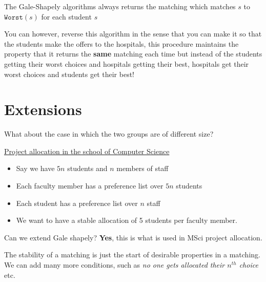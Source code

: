 \documentclass{article}
\begin{document}
  The Gale-Shapely algorithms always returns the matching which matches $s$ to $\texttt{Worst}(s) $ for each student $s$

  You can however, reverse this algorithm in the sense that you can make it so that the students make the offers to the hospitals, this procedure maintains the property that it returns the \textbf{same} matching each time but instead of the students getting their worst choices and hospitals getting their best, hospitals get their worst choices and students get their best!

  \section{Extensions}

  What about the case in which the two groups are of different size?

  \underline{Project allocation in the school of Computer Science}

  \begin{itemize}
    \item Say we have $5n$ students and $n$ members of staff
    \item Each faculty member has a preference list over $5n$ students
    \item Each student has a preference list over $n$ staff
    \item We want to have a stable allocation of 5 students per faculty member.
  \end{itemize}

  Can we extend Gale shapely? \textbf{Yes}, this is what is used in MSci project allocation.


  The stability of a matching is just the start of desirable properties in a matching. We can add many more conditions, such as \textit{no one gets allocated their $n^{th}$ choice}  etc.
\end{document}
